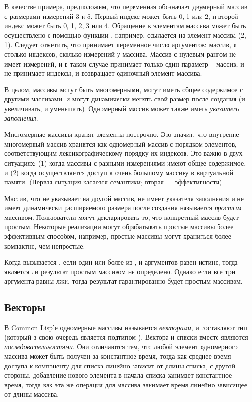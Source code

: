 В качестве примера, предположим, что переменная  обозначает двумерный
массив с размерами измерений 3 и 5. Первый индекс может быть 0, 1 или 2, и второй
индекс может быть 0, 1, 2, 3 или 4. Обращение к элементам массива может быть
осуществлено с помощью функции , например, 
ссылается на элемент массива (2, 1). Следует отметить, что  принимает
переменное число аргументов: массив, и столько индексов, сколько измерений у
массива.
Массив с нулевым рангом не имеет измерений, и в таком случае  принимает
только один параметр -- массив, и не принимает индексы, и возвращает одиночный
элемент массива.

В целом, массивы могут быть многомерными, могут иметь общее содержимое с
другими массивами. и могут динамически менять свой размер после создания (и
увеличивать, и уменьшать).
Одномерный массив может также иметь \emph{указатель заполнения}.

Многомерные массивы хранят элементы построчно.
Это значит, что внутренне многомерный массив хранится как одномерный массив с
порядком элементов, соответствующим лексикографическому порядку их индексов. Это
важно в двух ситуациях:
(1) когда массивы с разными измерениями имеют общее содержимое, и 
(2) когда осуществляется доступ к очень большому массиву в виртуальной памяти.
(Первая ситуация касается семантики; вторая --- эффективности)

Массив, что не указывает на другой массив, не имеет указателя заполнения и не
имеет динамически расширяемого размера после создания называется \emph{простым}
массивом. Пользователи могут декларировать то, что конкретный массив будет
простым. Некоторые реализации могут обрабатывать простые массивы более
эффективным способом, например, простые массивы могут храниться более компактно,
чем непростые. 

Когда вызывается , если один или более из ,
 и  аргументов равен истине, 
тогда является ли результат простым массивом не определено. Однако если все три
аргумента равны лжи, тогда результат гарантированно будет простым массивом.

\subsection{Векторы}

В Common Lisp'е одномерные массивы называется \emph{векторами}, и составляют тип
 (который в свою очередь является подтипом ).
Вектора и списки вместе являются \emph{последовательностями}. Они отличаются тем,
что любой элемент одномерного массива может быть получен за константное время,
тогда как среднее время доступа к компоненту для списка линейно зависит от длины
списка, с другой стороны, добавление нового элемента в начала списка занимает
константное время, тогда как эта же операция для массива занимает время линейно
зависящее от длины массива.

